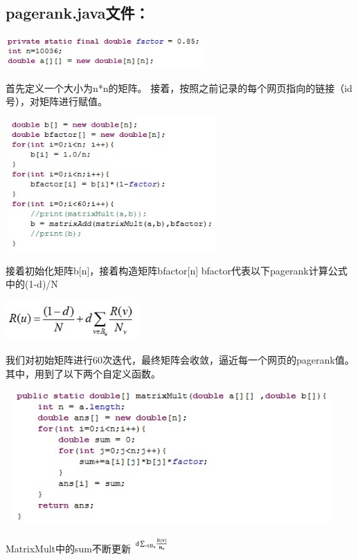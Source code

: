 ﻿\documentclass[UTF8]{ctexart}
\begin{document}
\begin{flushleft}
\subsection{pagerank.java文件：}
\par{}
\includegraphics[width=3.00in,height=0.50in]{figure5.jpg}
\par{}
首先定义一个大小为n*n的矩阵。
接着，按照之前记录的每个网页指向的链接（id号），对矩阵进行赋值。
\par{}
\includegraphics[width=3.20in,height=2.00in]{figure15.jpg}
\par{}
接着初始化矩阵b[n]，接着构造矩阵bfactor[n]
bfactor代表以下pagerank计算公式中的(1-d)/N
\par{}
\includegraphics[width=2.00in,height=0.60in]{figure16.jpg}
\par{}
我们对初始矩阵进行60次迭代，最终矩阵会收敛，逼近每一个网页的pagerank值。
其中，用到了以下两个自定义函数。
\par{}
\includegraphics[width=5.00in,height=2.00in]{figure17.jpg}
\par{}
MatrixMult中的sum不断更新
\includegraphics[width=0.50in,height=0.25in]{figure18.jpg}

\end{flushleft}
\end{document}
